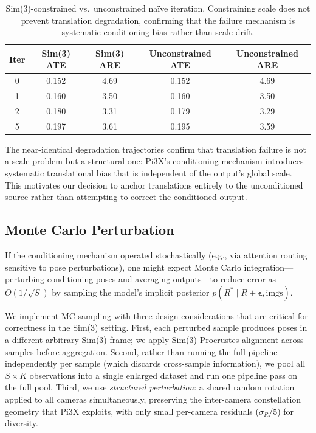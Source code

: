 \begin{table}[h]
\centering
\caption{Sim(3)-constrained vs.\ unconstrained na\"ive iteration. Constraining scale does not prevent translation degradation, confirming that the failure mechanism is systematic conditioning bias rather than scale drift.}
\label{tab:sim3}
\begin{tabular}{@{}ccccc@{}}
\toprule
Iter & Sim(3) ATE & Sim(3) ARE & Unconstrained ATE & Unconstrained ARE \\
\midrule
0 & 0.152 & 4.69\degree{} & 0.152 & 4.69\degree{} \\
1 & 0.160 & 3.50\degree{} & 0.160 & 3.50\degree{} \\
2 & 0.180 & 3.31\degree{} & 0.179 & 3.29\degree{} \\
5 & 0.197 & 3.61\degree{} & 0.195 & 3.59\degree{} \\
\bottomrule
\end{tabular}
\end{table}

The near-identical degradation trajectories confirm that translation failure is not a scale problem but a structural one: Pi3X's conditioning mechanism introduces systematic translational bias that is independent of the output's global scale. This motivates our decision to anchor translations entirely to the unconditioned source rather than attempting to correct the conditioned output.

\subsection{Monte Carlo Perturbation}
\label{sec:ablation_S}

If the conditioning mechanism operated stochastically (e.g., via attention routing sensitive to pose perturbations), one might expect Monte Carlo integration---perturbing conditioning poses and averaging outputs---to reduce error as $O(1/\sqrt{S})$ by sampling the model's implicit posterior $p(R^* \mid R + \boldsymbol{\epsilon}, \text{imgs})$.

We implement MC sampling with three design considerations that are critical for correctness in the Sim(3) setting. First, each perturbed sample produces poses in a different arbitrary Sim(3) frame; we apply Sim(3) Procrustes alignment across samples before aggregation. Second, rather than running the full pipeline independently per sample (which discards cross-sample information), we pool all $S \times K$ observations into a single enlarged dataset and run one pipeline pass on the full pool. Third, we use \emph{structured perturbation}: a shared random rotation applied to all cameras simultaneously, preserving the inter-camera constellation geometry that Pi3X exploits, with only small per-camera residuals ($\sigma_R / 5$) for diversity.

